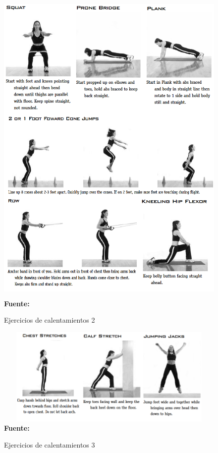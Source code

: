 \begin{figure}[H]
	\caption{Ejercicios de calentamientos 2}
	\label{fig:anxWarmup2}
	\centering
	\includegraphics[width=430px,height=600px]{graphics/warmup2.PNG} \\
	\textbf{Fuente:} \cite{arbour2006strength}
\end{figure}

\begin{figure}[H]
	\caption{Ejercicios de calentamientos 3}
	\label{fig:anxWarmup3}
	\centering
	\includegraphics[width=430px,height=180px]{graphics/warmup3.PNG} \\
	\textbf{Fuente:} \cite{arbour2006strength}
\end{figure}

